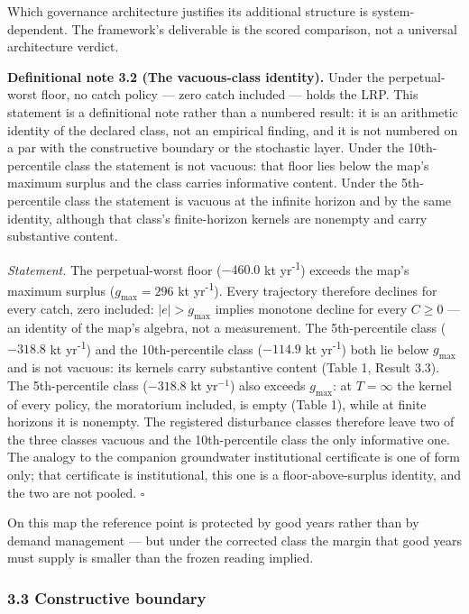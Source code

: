 \documentclass[11pt]{article}
\begin{document}
Which governance architecture justifies its additional structure is
system-dependent. The framework's deliverable is the scored comparison,
not a universal architecture verdict.

\textbf{Definitional note 3.2 (The vacuous-class identity).} Under the
perpetual-worst floor, no catch policy --- zero catch included --- holds
the LRP. This statement is a definitional note rather than a numbered
result: it is an arithmetic identity of the declared class, not an
empirical finding, and it is not numbered on a par with the constructive
boundary or the stochastic layer. Under the 10th-percentile class the
statement is not vacuous: that floor lies below the map's maximum
surplus and the class carries informative content. Under the
5th-percentile class the statement is vacuous at the infinite horizon
and by the same identity, although that class's finite-horizon kernels
are nonempty and carry substantive content.

\emph{Statement.} The perpetual-worst floor (\(-460.0\) kt yr\textsuperscript{-1}) exceeds
the map's maximum surplus (\(g_{\max} = 296\) kt yr\textsuperscript{-1}). Every trajectory
therefore declines for every catch, zero included: \(|e| > g_{\max}\)
implies monotone decline for every \(C \ge 0\) --- an identity of the
map's algebra, not a measurement. The 5th-percentile class (\(-318.8\)
kt yr\textsuperscript{-1}) and the 10th-percentile class (\(-114.9\) kt yr\textsuperscript{-1}) both lie
below \(g_{\max}\) and is not vacuous: its kernels carry substantive
content (Table 1, Result 3.3). The 5th-percentile class (\(-318.8\) kt
yr\(^{-1}\)) also exceeds \(g_{\max}\): at \(T = \infty\) the kernel of
every policy, the moratorium included, is empty (Table 1), while at
finite horizons it is nonempty. The registered disturbance classes
therefore leave two of the three classes vacuous and the
10th-percentile class the only informative one. The
analogy to the companion groundwater institutional certificate is one of
form only; that certificate is institutional, this one is a
floor-above-surplus identity, and the two are not pooled. \ensuremath{\square}

On this map the reference point is protected by good years rather than
by demand management --- but under the corrected class the margin that
good years must supply is smaller than the frozen reading implied.

\subsubsection{3.3 Constructive boundary}\label{constructive-boundary}
\end{document}
